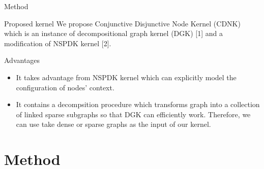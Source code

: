 \documentclass{beamer}
\begin{document}
\begin{frame}[t]{Method}
\vspace{-.3cm}
\begin{block}{Proposed kernel}
	We propose Conjunctive Disjunctive Node Kernel (CDNK) which is an instance of decompositional graph kernel (DGK) [1] and a modification of NSPDK kernel [2].
\end{block} \vspace{.5em}

\begin{block}{Advantages}
	\begin{itemize}
		\item It takes advantage from NSPDK kernel which can explicitly model the configuration of nodes' context.\vspace{.4em}
		\item It contains a decompsition procedure which transforms graph into a collection of linked sparse subgraphs so that DGK can efficiently work. Therefore, we can use take dense or sparse graphs as the input of our kernel.
	\end{itemize}
\end{block}
	



\end{frame}
\section{Method}
\end{document}
